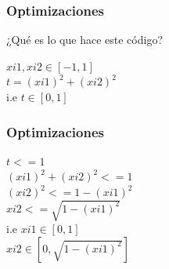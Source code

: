 \documentclass{beamer}
\begin{document}
\begin{frame}
    \frametitle{Optimizaciones}
    ¿Qué es lo que hace este código? \\ \pause
    \begin{center}
        $xi1, xi2  \in [-1, 1] $ \\ \pause
        $t = (xi1)^2 + (xi2)^2$ \\ \pause
        i.e $ t \in [0,1]$
    
    \end{center}

\end{frame}


\begin{frame}
    \frametitle{Optimizaciones}
    \begin{center}
        $ t <= 1 $ \\\pause
        $(xi1)^2 + (xi2)^2 <= 1$ \\\pause
        $(xi2)^2 <= 1 - (xi1)^2$ \\\pause
        $xi2 <= \sqrt{1 - (xi1)^2}$\\\pause
        i.e $xi1 \in [0, 1]$\\
        $xi2 \in [0, \sqrt{1 - (xi1)^2}]$    

    \end{center}


\end{frame}
\end{document}
